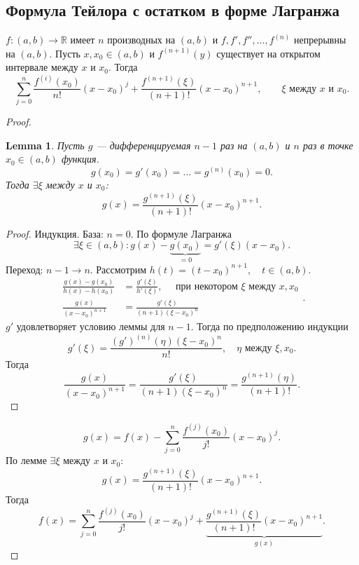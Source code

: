 \documentclass[11pt]{book}
\newcommand{\R}{\mathbb{R}}
\theoremstyle{definition}
\theoremstyle{plain}
\theoremstyle{plain}
\newtheorem*{lm}{Lemma}
\theoremstyle{definition}
\theoremstyle{remark}
\begin{document}
\subsection{Формула Тейлора с остатком в форме Лагранжа} 
\begin{thm}
    $ f: (a, b) \to  \R$ имеет $ n$ производных на $ (a,b)$ и $f, f', f'', \ldots, f^{(n)}$  непрерывны на $ (a, b)$.
    Пусть $ x, x_0 \in (a, b)$ и $ f^{(n+1)}(y)$ существует на открытом интервале между $ x$ и $ x_0$.
    Тогда 
    \[
	\sum _{j=0}^{n}\frac{f^{(i)} (x_0)}{n!}(x-x_0)^{j} + \frac{f^{(n+1)}(\xi)}{(n+1)!} (x-x_0)^{n+1}, \qquad \xi \text{ между } x  \text{ и } x_0
    .\] 
\end{thm}
\begin{proof}
    \begin{lm}
	Пусть $ g$ --- дифференцируемая $ n-1$ раз на $(a, b)$ и $ n$ раз в точке $ x_0 \in (a, b)$ функция. \[
	    g(x_0) = g'(x_0) = \ldots = g^{(n)}(x_0) = 0
	.\]  
	Тогда $ \exists \xi$ между $ x$ и $ x_0$: \[
	    g(x) = \frac{g^{(n+1)}(\xi)}{(n+1)!}(x-x_0)^{n+1}
	.\] 
    \end{lm}
    \begin{proof}
        Индукция. База: $ n = 0$. По формуле Лагранжа
	\[
	    \exists \xi \in (a, b): g(x) - \underbrace{g(x_0)}_{=0} = g'(\xi)(x-x_0)
	.\] 
	Переход: $ n-1 \to  n$.
	Рассмотрим $ h(t) = (t - x_0)^{n+1}, \quad t \in (a, b)$.
	\[
	    \begin{aligned}
		\frac{g(x) - g(x_0)}{h(x) - h(x_0)} &=\frac{g'(\xi)}{h'(\xi)}, \quad \text{ при некотором } \xi \text{ между } x, x_0\\
		\frac{g(x)}{(x-x_0)^{n+1}} &= \frac{g'(\xi)}{(n+1)({\xi - x_0})^{n}}
	    \end{aligned}
	.\] 
	$ g'$ удовлетворяет условию леммы для  $ n-1$. Тогда по предположению индукции 
	 \[
	     g'(\xi) = \frac{(g')^{(n)}(\eta)(\xi - x_0)^{n}}{n!}, \quad \eta \text{ между } \xi, x_0
	.\] 
	Тогда 
	\[
	    \frac{g(x)}{(x-x_0)^{n+1}}	=    \frac{g'(\xi)}{(n+1)({\xi - x_0})^{n}} = \frac{g^{(n+1)}(\eta)}{(n+1)!}
	.\] 
    \end{proof}
    \[
	g(x) = f(x) - \sum_{j=0}^{n}\frac{f^{(j)}(x_0)}{j!} (x-x_0)^{j}
    .\] 
    По лемме $ \exists \xi$ между $ x$ и $ x_0$:
    \[
	    g(x) = \frac{g^{(n+1)}(\xi)}{(n+1)!}(x-x_0)^{n+1}
	.\] 
	Тогда 
	\[
	    f(x) = 
	    \sum_{j=0}^{n}\frac{f^{(j)}(x_0)}{j!} (x-x_0)^{j}  +  \underbrace{\frac{g^{(n+1)}(\xi)}{(n+1)!}(x-x_0)^{n+1}}_{g(x)}
	.\] 

\end{proof}
\end{document}
